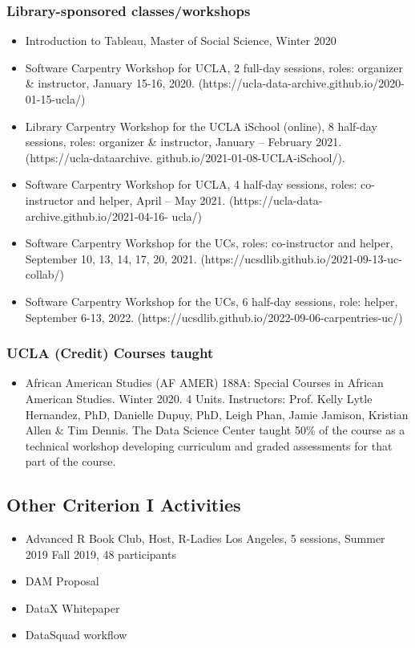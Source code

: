 \subsubsection{Library-sponsored classes/workshops}

\begin{itemize}[label={}, leftmargin=!,labelindent=5pt,itemindent=-15pt]
  \item Introduction to Tableau, Master of Social Science, Winter 2020
\item Software Carpentry Workshop for UCLA, 2 full-day sessions, roles: organizer \& instructor, January 15-16, 2020. (https://ucla-data-archive.github.io/2020-01-15-ucla/)
\item Library Carpentry Workshop for the UCLA iSchool (online), 8 half-day sessions, roles: organizer \& instructor, January – February 2021. (https://ucla-dataarchive.
github.io/2021-01-08-UCLA-iSchool/).
\item Software Carpentry Workshop for UCLA, 4 half-day sessions, roles: co-instructor and helper, April – May 2021. (https://ucla-data-archive.github.io/2021-04-16-
ucla/)
\item Software Carpentry Workshop for the UCs, roles: co-instructor and helper, September
10, 13, 14, 17, 20, 2021. (https://ucsdlib.github.io/2021-09-13-uc-collab/)
\item Software Carpentry Workshop for the UCs, 6 half-day sessions, role: helper, September 6-13, 2022. (https://ucsdlib.github.io/2022-09-06-carpentries-uc/)

 
\end{itemize}

\subsubsection{UCLA (Credit) Courses taught}

\begin{itemize}[label={},leftmargin=!,labelindent=5pt,itemindent=-15pt]
    \item African American Studies (AF AMER) 188A: Special Courses in African American Studies. Winter 2020. 4 Units. Instructors: Prof. Kelly Lytle Hernandez, PhD, Danielle Dupuy, PhD, Leigh Phan, Jamie Jamison, Kristian Allen \& Tim Dennis. The Data Science Center taught 50\% of the course as a technical workshop developing curriculum and graded assessments for that part of the course.
\end{itemize}

\subsection{Other Criterion I Activities}

\begin{itemize}[label={},leftmargin=!,labelindent=5pt,itemindent=-15pt]
  \item Advanced R Book Club, Host, R-Ladies Los Angeles, 5 sessions, Summer 2019 \textbar Fall 2019,	48 participants
  \item  DAM Proposal 
\item DataX Whitepaper 
\item DataSquad workflow 
\end{itemize}
